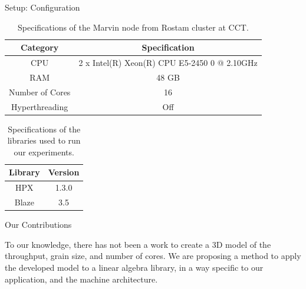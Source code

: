 \documentclass[10pt]{beamer}
\begin{document}
\begin{frame}{Setup: Configuration}
	\begin{outline}
	\vspace{\baselineskip}	
	\begin{table}[H]
		\centering
		\scalebox{0.75}
		{\begin{tabular}{|c | c |} 
				\hline
				
				Category & Specification\\
				\hline
				\hline
				CPU &  2 x Intel(R) Xeon(R) CPU E5-2450 0 @ 2.10GHz \\ [0.5ex] 
				\hline
				RAM & 48 GB\\ 	
				\hline
				Number of Cores & 16\\
				\hline	
				Hyperthreading & Off \\
				\hline			
		\end{tabular}}	
		\caption{Specifications of the Marvin node from Rostam cluster at CCT.}
		\label{table3}
	\end{table} 
\begin{table}[H]
	\centering
	\scalebox{0.75}
	{\begin{tabular}{|c | c |} 
			\hline
			Library & Version \\
			\hline
			\hline
			HPX & 1.3.0 \\ 
			\hline
			Blaze & 3.5\\ 	
			\hline
			
	\end{tabular}}	
	\caption{Specifications of the libraries used to run our experiments.}
	\label{table5}
\end{table}
	\end{outline}
\end{frame}



\begin{frame}{Our Contributions}
	\begin{outline}
		\1To our knowledge, there has not been a work to create a 3D model of the throughput, grain size, and number of cores. 
		\1We are proposing a method to apply the developed model to a linear algebra library, in a way specific to our application, and the machine architecture.
	\end{outline}
\end{frame}
\end{document}

